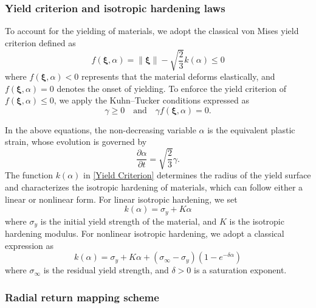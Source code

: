 \documentclass[preprint,11pt]{elsarticle}
\theoremstyle{definition}
\begin{document}
\subsubsection{Yield criterion and isotropic hardening laws}

To account for the yielding of materials, we adopt the classical von Mises yield criterion defined as
\begin{equation} \label{Yield Criterion}
    f(\boldsymbol{\xi}, \alpha) = \lVert \boldsymbol{\xi} \rVert - \sqrt{\dfrac{2}{3}} k(\alpha) \leq 0
\end{equation}
where $f(\boldsymbol{\xi}, \alpha) < 0$ represents that the material deforms elastically, and $f(\boldsymbol{\xi}, \alpha) = 0$ denotes the onset of yielding. To enforce the yield criterion of $f(\boldsymbol{\xi}, \alpha) \leq 0$, we apply the Kuhn--Tucker conditions expressed as
\begin{equation} \label{Kuhn Tucker Conditions}
    \gamma \geq 0
    \quad \text{and} \quad
    \gamma f(\boldsymbol{\xi}, \alpha) = 0.
\end{equation}

In the above equations, the non-decreasing variable $\alpha$ is the equivalent plastic strain, whose evolution is governed by \citep{simo_framework_1988-1, simo_framework_1988}
\begin{equation} \label{Evolution of Equivalent Plastic Strain}
    \dfrac{\partial \alpha}{\partial t} = \sqrt{\dfrac{2}{3}} \gamma.
\end{equation}
The function $k(\alpha)$ in \eqref{Yield Criterion} determines the radius of the yield surface and characterizes the isotropic hardening of materials, which can follow either a linear or nonlinear form. For linear isotropic hardening, we set
\begin{equation} \label{Linear Isotropic Hardening Law}
    k(\alpha) = \sigma_y + K \alpha
\end{equation}
where $\sigma_y$ is the initial yield strength of the material, and $K$ is the isotropic hardening modulus. For nonlinear isotropic hardening, we adopt a classical expression as \citep{simo_framework_1988}
\begin{equation} \label{Nonlinear Isotropic Hardening Law}
    k(\alpha) = \sigma_y + K \alpha + (\sigma_\infty - \sigma_y)(1 - e^{- \delta \alpha})
\end{equation}
where $\sigma_\infty$ is the residual yield strength, and $\delta>0$ is a saturation exponent.

\subsubsection{Radial return mapping scheme}
\label{Return mapping scheme}
\end{document}
